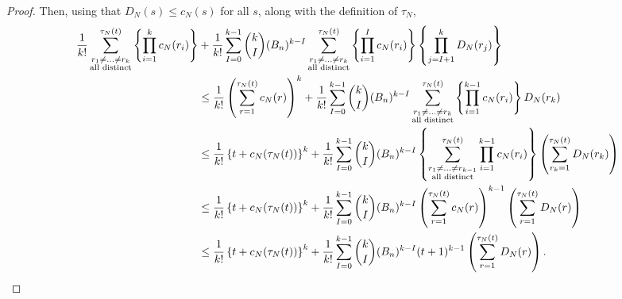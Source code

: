 \documentclass{article}
\newcommand{\1}[1]{\mathbbm{1}_{#1}}
\begin{document}
\begin{proof}
Then, using that $D_N(s) \leq c_N(s)$ for all $s$, along with the definition of $\tau_N$,
\begin{align}
\frac{1}{k!} \sum_{\substack{r_1\neq\dots\neq r_k \\\text{all distinct}}}^{\tau_N(t)} 
\left\{ \prod_{i=1}^{k} c_N(r_i) \right\} 
& + \frac{1}{k!}
\sum_{I=0}^{k-1}  \binom{k}{I}
( B_n )^{k-I}
\sum_{\substack{r_1\neq\dots\neq r_k \\\text{all distinct}}}^{\tau_N(t)} 
\left\{ \prod_{i=1}^{I} c_N(r_i) \right\} \left\{ \prod_{j=I+1}^k D_N(r_j) \right\}\notag\\
&\leq  \frac{1}{k!} \left( \sum_{r=1}^{\tau_N(t)} c_N(r) \right)^k
+ \frac{1}{k!}
\sum_{I=0}^{k-1}  \binom{k}{I}
( B_n )^{k-I}
\sum_{\substack{r_1\neq\dots\neq r_k \\\text{all distinct}}}^{\tau_N(t)} 
\left\{ \prod_{i=1}^{k-1} c_N(r_i) \right\} D_N(r_k) \notag\\
&\leq  \frac{1}{k!} \left\{ t + c_N(\tau_N(t)) \right\}^k
+ \frac{1}{k!}
\sum_{I=0}^{k-1}  \binom{k}{I}
( B_n )^{k-I}
\left\{ \sum_{\substack{r_1\neq\dots\neq r_{k-1} \\\text{all distinct}}}^{\tau_N(t)} 
\prod_{i=1}^{k-1} c_N(r_i) \right\} 
\left( \sum_{r_k =1}^{\tau_N(t)} D_N(r_k) \right) \notag\\
&\leq  \frac{1}{k!} \left\{ t + c_N(\tau_N(t)) \right\}^k
+ \frac{1}{k!}
\sum_{I=0}^{k-1}  \binom{k}{I}
( B_n )^{k-I}
\left( \sum_{r=1}^{\tau_N(t)} c_N(r) \right)^{k-1}
\left( \sum_{r=1}^{\tau_N(t)} D_N(r) \right) \notag\\
&\leq  \frac{1}{k!} \left\{ t + c_N(\tau_N(t)) \right\}^k
+ \frac{1}{k!}
\sum_{I=0}^{k-1}  \binom{k}{I}
( B_n )^{k-I}
(t+1)^{k-1}
\left( \sum_{r=1}^{\tau_N(t)} D_N(r) \right) . \label{eq:8}
\end{align}

\end{proof}
\end{document}

